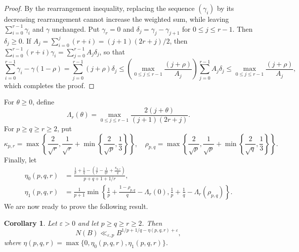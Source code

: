 \documentclass[a4paper,11pt,twoside,reqno]{amsart}
\newtheorem{corollary}[theorem]{Corollary}
\theoremstyle{definition}
\theoremstyle{remark}
\numberwithin{equation}{section}
\newcommand\ve{\varepsilon}
\newcommand\1{\mathbf{1}}
\renewcommand{\leq}{\leqslant}
\renewcommand{\geq}{\geqslant}
\begin{document}
\begin{proof}
By the rearrangement inequality, replacing the sequence
$(\gamma_i)$ by its decreasing rearrangement cannot increase the weighted sum, 
while leaving $\sum_{i=0}^{r-1}\gamma_i$ and $\gamma$ unchanged.
Put $\gamma_r=0$ and $\delta_j=\gamma_j-\gamma_{j+1}$ for $0\leq j\leq r-1$. Then $\delta_j\geq0$. If $A_j=\sum_{i=0}^j(r+i)=(j+1)(2r+j)/2$, then $\sum_{i=0}^{r-1}(r+i)\gamma_i=\sum_{j=0}^{r-1}A_j\delta_j$, so that 
\[
\sum_{i=0}^{r-1}\gamma_i-\gamma(1-\rho)=\sum_{j=0}^{r-1}(j+\rho)\delta_j\leq \left(\max_{0\leq j\leq r-1}\frac{(j+\rho)}{A_j}\right)\sum_{j=0}^{r-1}A_j\delta_j\leq \max_{0\leq j\leq r-1}\frac{(j+\rho)}{A_j},
\]
which completes the proof.
\end{proof}

For $\theta\geq0$, define
\[
\Lambda_r(\theta)
 =
 \max_{0\leq j\leq r-1}
 \frac{2(j+\theta)}{(j+1)(2r+j)}.
\]
For $p\geq q\geq r\geq2$, put
\[
\kappa_{p,r}
 =
 \max\left\{
 \frac{2}{\sqrt r},
 \frac1{\sqrt r}
 +\min\left\{\frac2{\sqrt p},\frac13\right\}
 \right\}, \quad 
\rho_{p,q}
 =
 \max\left\{
 \frac2{\sqrt p},
 \frac1{\sqrt p}
 +\min\left\{\frac2{\sqrt q},\frac13\right\}
 \right\}.
\]
Finally, let
\begin{align*}
\eta_0(p,q,r)
 &=
 \frac{
 \displaystyle
 \frac1p+\frac1q-
 \left(
 \frac1r-\frac1{qr}+\frac{\kappa_{p,r}}q
 \right)}
 {p+q+1+1/r},\\
\eta_1(p,q,r)
& =
 \frac1{p+1}
 \min\left\{
 \frac1p+\frac{1-\rho_{p,q}}q-\Lambda_r(0),
 \frac1p+\frac1q-\Lambda_r(\rho_{p,q})
 \right\}.
\end{align*}
We are now ready to prove the following result. 

\begin{corollary}\label{cor:general-campana-bound}
Let $\ve>0$ and let $p\geq q\geq r\geq2$. Then
\[
N(B)
 \ll_{\varepsilon,p}
 B^{1/p+1/q-\eta(p,q,r)+\varepsilon},
\]
where
$\eta(p,q,r)
 =
 \max\{0,\eta_0(p,q,r),\eta_1(p,q,r)\}$.
\end{corollary}
\end{document}
